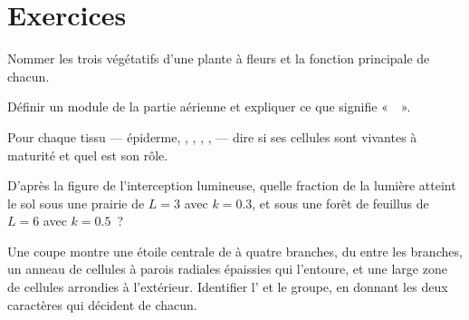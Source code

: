 \section{Exercices}

\begin{exercise}[$\star$]\label{exo:b1:flowering-plant-organization:1}
Nommer les trois  végétatifs d'une plante à fleurs et la
fonction principale de chacun.
\end{exercise}

\begin{exercise}[$\star$]\label{exo:b1:flowering-plant-organization:2}
Définir un module de la partie aérienne et expliquer ce que signifie
«~~».
\end{exercise}

\begin{exercise}[$\star$]\label{exo:b1:flowering-plant-organization:3}
Pour chaque tissu --- épiderme, , , ,
,  --- dire si ses cellules sont vivantes à maturité et
quel est son rôle.
\end{exercise}

\begin{exercise}[$\star$]\label{exo:b1:flowering-plant-organization:4}
D'après la figure de l'interception lumineuse, quelle fraction de la
lumière atteint le sol sous une prairie de $L = 3$ avec $k = 0.3$, et
sous une forêt de feuillus de $L = 6$ avec $k = 0.5$~?
\end{exercise}

\begin{exercise}[$\star\star$]\label{exo:b1:flowering-plant-organization:5}
Une coupe montre une étoile centrale de  à quatre branches, du
 entre les branches, un anneau de cellules à parois radiales
épaissies qui l'entoure, et une large zone de cellules arrondies à
l'extérieur. Identifier l' et le groupe, en donnant les deux
caractères qui décident de chacun.
\end{exercise}

